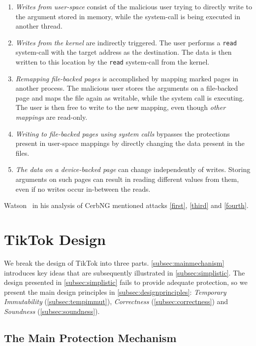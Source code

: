 \documentclass[conference]{IEEEtran}
\newcommand{\sysname}{TikTok}
\begin{document}
\begin{enumerate}
  \item \label{first} \emph{Writes from user-space} consist of the malicious user trying to directly
  write to the argument stored in memory, while the system-call is being executed
  in another thread. 
  \item \label{second} \emph{Writes from the kernel} are indirectly triggered. The user performs a
  \texttt{read} system-call with the target address as the destination. The data
  is then written to this location by the \texttt{read} system-call from the
  kernel.
  \item \label{third} \emph{Remapping file-backed pages} is accomplished by mapping marked pages in
  another process. The malicious user stores the arguments on a file-backed page
  and maps the file again as writable, while the system call is executing. The
  user is then free to write to the new mapping, even though \emph{other mappings}
  are read-only.
  \item \label{fourth} \emph{Writing to file-backed pages using system calls} bypasses
  the protections present in user-space mappings by directly changing the data present in
  the files.
  \item \label{fifth} \emph{The data on a device-backed page} can change
  independently of writes. Storing arguments on such pages can result in reading
  different values from them, even if no writes occur in-between the reads.
\end{enumerate}

Watson~\cite{watson2007exploiting} in his analysis of CerbNG mentioned attacks
\autoref{first}, \autoref{third} and \autoref{fourth}.

\section{\sysname{} Design}
\label{sec:design}

We break the design of \sysname{} into three parts.
\autoref{subsec:mainmechanism} introduces key ideas that are subsequently
illustrated in \autoref{subsec:simplistic}. The design presented in
\autoref{subsec:simplistic} fails to provide adequate protection, so we present
the main design principles in \autoref{subsec:designprinciples}: \emph{Temporary
Immutability} (\autoref{subsec:tempimmut}), \emph{Correctness}
(\autoref{subsec:correctness}) and \emph{Soundness} (\autoref{subsec:soundness}).

\subsection{The Main Protection Mechanism}
\label{subsec:mainmechanism}
\end{document}
